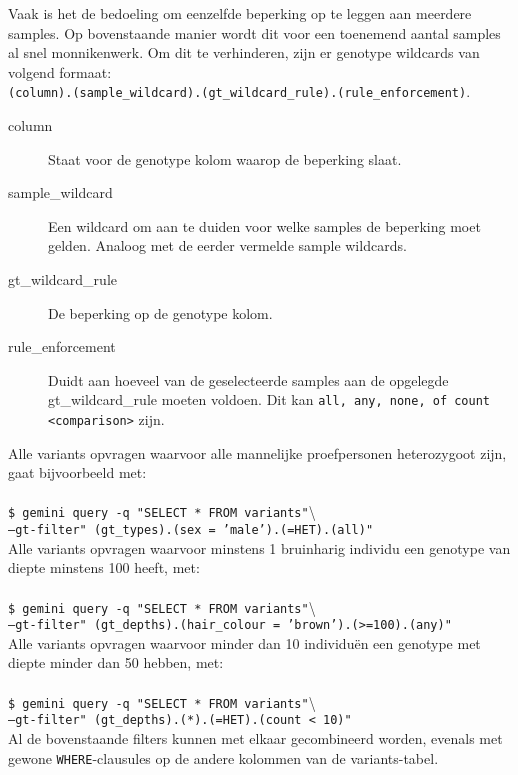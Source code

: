 \noindent Vaak is het de bedoeling om eenzelfde beperking op te leggen aan meerdere samples. Op bovenstaande manier wordt dit voor een toenemend aantal samples al snel monnikenwerk. Om dit te verhinderen, zijn er genotype wildcards van volgend formaat:\\ 
\texttt{(column).(sample\_wildcard).(gt\_wildcard\_rule).(rule\_enforcement)}.
\begin{description}
\item[column] Staat voor de genotype kolom waarop de beperking slaat.
\item[sample\_wildcard] Een wildcard om aan te duiden voor welke samples de beperking moet gelden. Analoog met de eerder vermelde sample wildcards.
\item[gt\_wildcard\_rule] De beperking op de genotype kolom.
\item[rule\_enforcement] Duidt aan hoeveel van de geselecteerde samples aan de opgelegde gt\_wildcard\_rule moeten voldoen. Dit kan \texttt{all, any, none, of count <comparison>} zijn.
\end{description}

\noindent Alle variants opvragen waarvoor alle mannelijke proefpersonen heterozygoot zijn, gaat bijvoorbeeld met:\\\\
\texttt{\$ gemini query -q "}\texttt{SELECT * FROM variants"}\textbackslash \\
\texttt{--gt-filter" }\texttt{(gt\_types).(sex = 'male').(=HET).(all)"}\\

\noindent Alle variants opvragen waarvoor minstens 1 bruinharig individu een genotype van diepte minstens 100 heeft, met:\\\\
\texttt{\$ gemini query -q "}\texttt{SELECT * FROM variants"}\textbackslash \\
\texttt{--gt-filter" }\texttt{(gt\_depths).(hair\_colour = 'brown').(>=100).(any)"}\\

\noindent Alle variants opvragen waarvoor minder dan 10 individu\"en een genotype met diepte minder dan 50 hebben, met:\\\\
\texttt{\$ gemini query -q "}\texttt{SELECT * FROM variants"}\textbackslash \\
\texttt{--gt-filter" }\texttt{(gt\_depths).(*).(=HET).(count < 10)"}\\

\noindent Al de bovenstaande filters kunnen met elkaar gecombineerd worden, evenals met gewone \texttt{WHERE}-clausules op de andere kolommen van de variants-tabel.

